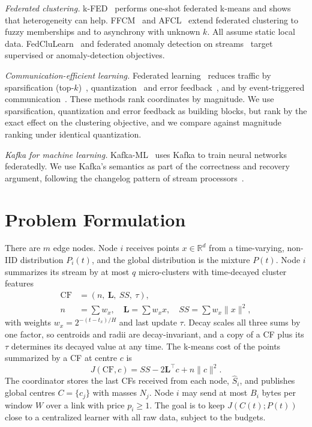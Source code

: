\documentclass[journal]{IEEEtran}
\newcommand{\LS}{\mathbf{L}}
\newcommand{\cf}{\mathrm{CF}}
\begin{document}
\textit{Federated clustering.} k-FED~\cite{dennis2021kfed} performs one-shot federated k-means and shows that heterogeneity can help. FFCM~\cite{stallmann2022ffcm} and AFCL~\cite{zhang2025afcl} extend federated clustering to fuzzy memberships and to asynchrony with unknown $k$. All assume static local data. FedCluLearn~\cite{angelova2025fedclulearn} and federated anomaly detection on streams~\cite{silva2022federated,li2025dfas} target supervised or anomaly-detection objectives.

\textit{Communication-efficient learning.} Federated learning~\cite{mcmahan2017fedavg,kairouz2021advances} reduces traffic by sparsification (top-$k$)~\cite{aji2017sparse,lin2018dgc,sattler2020stc}, quantization~\cite{alistarh2017qsgd} and error feedback~\cite{stich2018sparsified,karimireddy2019ef}, and by event-triggered communication~\cite{ghosh2021eventgrad,zehtabi2022event}. These methods rank coordinates by magnitude. We use sparsification, quantization and error feedback as building blocks, but rank by the exact effect on the clustering objective, and we compare against magnitude ranking under identical quantization.

\textit{Kafka for machine learning.} Kafka-ML~\cite{martin2022kafkaml,carnerero2024kafkaml} uses Kafka to train neural networks federatedly. We use Kafka's semantics as part of the correctness and recovery argument, following the changelog pattern of stream processors~\cite{kreps2011kafka,carbone2017flinkstate}.

\section{Problem Formulation}\label{sec:problem}
There are $m$ edge nodes. Node $i$ receives points $x\in\mathbb{R}^d$ from a time-varying, non-IID distribution $P_i(t)$, and the global distribution is the mixture $P(t)$. Node $i$ summarizes its stream by at most $q$ micro-clusters with time-decayed cluster features~\cite{zhang1996birch,cao2006denstream}
\begin{equation}
\begin{split}
\cf&=(n,\ \LS,\ SS,\ \tau),\\
n&=\textstyle\sum w_x,\quad \LS=\sum w_x x,\quad SS=\sum w_x\|x\|^2,
\end{split}
\end{equation}
with weights $w_x=2^{-(t-t_x)/H}$ and last update $\tau$. Decay scales all three sums by one factor, so centroids and radii are decay-invariant, and a copy of a CF plus its $\tau$ determines its decayed value at any time. The k-means cost of the points summarized by a CF at centre $c$ is
\begin{equation}\label{eq:cost}
J(\cf,c)=SS-2\LS^{\!\top}c+n\|c\|^2 .
\end{equation}
The coordinator stores the last CFs received from each node, $\hat S_i$, and publishes global centres $C=\{c_j\}$ with masses $N_j$. Node $i$ may send at most $B_i$ bytes per window $W$ over a link with price $p_i\ge1$. The goal is to keep $J(C(t);P(t))$ close to a centralized learner with all raw data, subject to the budgets.
\end{document}
